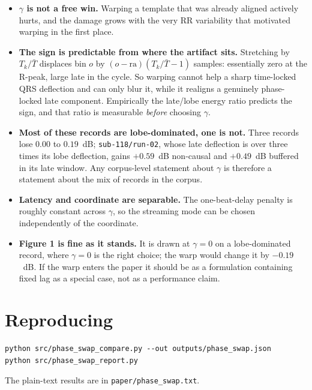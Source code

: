 \documentclass[11pt]{article}
\begin{document}
\begin{itemize}[leftmargin=1.4em,itemsep=0.25em]
\item \textbf{$\gamma$ is not a free win.} Warping a template that was already aligned actively
hurts, and the damage grows with the very RR variability that motivated warping in the first place.
\item \textbf{The sign is predictable from where the artifact sits.} Stretching by $T_k/\bar T$
displaces bin $o$ by $(o-\mathrm{ra})(T_k/\bar T - 1)$ samples: essentially zero at the R-peak,
large late in the cycle. So warping cannot help a sharp time-locked QRS deflection and can only
blur it, while it realigns a genuinely phase-locked late component. Empirically the late/lobe
energy ratio predicts the sign, and that ratio is measurable \emph{before} choosing $\gamma$.
\item \textbf{Most of these records are lobe-dominated, one is not.} Three records lose $0.00$ to
$0.19$~dB; \texttt{sub-118/run-02}, whose late deflection is over three times its lobe deflection,
gains $+0.59$~dB non-causal and $+0.49$~dB buffered in its late window. Any corpus-level statement
about $\gamma$ is therefore a statement about the mix of records in the corpus.
\item \textbf{Latency and coordinate are separable.} The one-beat-delay penalty is roughly constant
across $\gamma$, so the streaming mode can be chosen independently of the coordinate.
\item \textbf{Figure 1 is fine as it stands.} It is drawn at $\gamma=0$ on a lobe-dominated record,
where $\gamma=0$ is the right choice; the warp would change it by $-0.19$~dB. If the warp enters
the paper it should be as a formulation containing fixed lag as a special case, not as a
performance claim.
\end{itemize}

\section*{Reproducing}

\begin{verbatim}
python src/phase_swap_compare.py --out outputs/phase_swap.json
python src/phase_swap_report.py
\end{verbatim}

\noindent The plain-text results are in \texttt{paper/phase\_swap.txt}.
\end{document}

